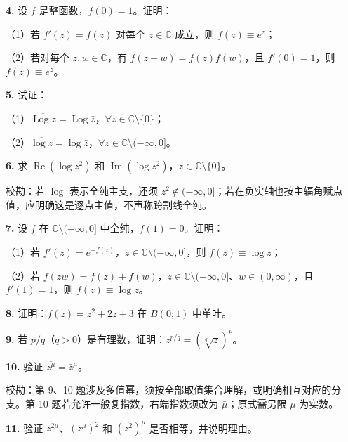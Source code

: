 \documentclass[11pt,a4paper]{article}
\begin{document}
\par{}
\noindent\textbf{4.} 设 \(f\) 是整函数，\(f(0)=1\)。证明：

（1）若 \(f'(z)=f(z)\) 对每个 \(z\in\mathbb C\) 成立，则
\(f(z)\equiv e^z\)；

（2）若对每个 \(z,w\in\mathbb C\)，有 \(f(z+w)=f(z)f(w)\)，且
\(f'(0)=1\)，则 \(f(z)\equiv e^z\)。

\par{}
\noindent\textbf{5.} 试证：

（1）\(\overline{\operatorname{Log}z}=\operatorname{Log}\bar z\)，\(\forall z\in\mathbb C\setminus\{0\}\)；

（2）\(\overline{\log z}=\log\bar z\)，\(\forall z\in\mathbb C\setminus(-\infty,0]\)。

\par{}
\noindent\textbf{6.} 求 \(\operatorname{Re}(\log z^2)\) 和
\(\operatorname{Im}(\log z^2)\)，\(z\in\mathbb C\setminus\{0\}\)。

校勘：若 \(\log\) 表示全纯主支，还须
\(z^2\notin(-\infty,0]\)；若在负实轴也按主辐角赋点值，应明确这是逐点主值，不声称跨割线全纯。

\par{}
\noindent\textbf{7.} 设 \(f\) 在 \(\mathbb C\setminus(-\infty,0]\)
中全纯，\(f(1)=0\)。证明：

（1）若 \(f'(z)=e^{-f(z)}\)，\(z\in\mathbb C\setminus(-\infty,0]\)，则
\(f(z)\equiv\log z\)；

（2）若
\(f(zw)=f(z)+f(w)\)，\(z\in\mathbb C\setminus(-\infty,0]\)、\(w\in(0,\infty)\)，且
\(f'(1)=1\)，则 \(f(z)\equiv\log z\)。

\par{}
\noindent\textbf{8.} 证明：\(f(z)=z^2+2z+3\) 在 \(B(0;1)\) 中单叶。

\par{}
\noindent\textbf{9.} 若
\(p/q\)（\(q>0\)）是有理数，证明：\(z^{p/q}=(\sqrt[q]{z})^p\)。

\par{}
\noindent\textbf{10.} 验证 \(\overline{z^\mu}=\bar z^\mu\)。

校勘：第 9、10
题涉及多值幂，须按全部取值集合理解，或明确相互对应的分支。第 10
题若允许一般复指数，右端指数须改为 \(\bar\mu\)；原式需另限 \(\mu\)
为实数。

\par{}
\noindent\textbf{11.} 验证 \(z^{2\mu}\)、\((z^\mu)^2\) 和 \((z^2)^\mu\)
是否相等，并说明理由。
\end{document}
